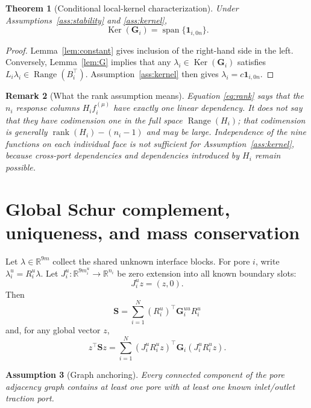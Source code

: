 \documentclass[11pt,a4paper]{article}
\newtheorem{assumption}{Assumption}[section]
\newtheorem{theorem}[assumption]{Theorem}
\newtheorem{remark}[assumption]{Remark}
\newcommand{\R}{\mathbb{R}}
\newcommand{\DtN}{\mathbf G}
\newcommand{\Schur}{\mathbf S}
\newcommand{\one}{\bm 1}
\newcommand{\Range}{\operatorname{Range}}
\newcommand{\Ker}{\operatorname{Ker}}
\newcommand{\rank}{\operatorname{rank}}
\begin{document}
\begin{theorem}[Conditional local-kernel characterization]
\label{thm:local-kernel}
Under Assumptions~\ref{ass:stability} and \ref{ass:kernel},
\begin{equation}\label{eq:exact-local-kernel}
 \Ker(\DtN_i)=\operatorname{span}\{\one_{i,0n}\}.
\end{equation}
\end{theorem}

\begin{proof}
Lemma~\ref{lem:constant} gives inclusion of the right-hand side in the left.
Conversely, Lemma~\ref{lem:G} implies that any
$\lambda_i\in\Ker(\DtN_i)$ satisfies
$L_i\lambda_i\in\Range(B_i^\top)$.  Assumption~\ref{ass:kernel} then gives
$\lambda_i=c\one_{i,0n}$.
\end{proof}

\begin{remark}[What the rank assumption means]
Equation \eqref{eq:rank} says that the $n_i$ response columns
$H_if_i^{(\mu)}$ have exactly one linear dependency.  It does \emph{not} say
that they have codimension one in the full space $\Range(H_i)$; that
codimension is generally
$\rank(H_i)-(n_i-1)$ and may be large.  Independence of the nine functions on
each individual face is not sufficient for Assumption~\ref{ass:kernel},
because cross-port dependencies and dependencies introduced by $H_i$ remain
possible.
\end{remark}

\section{Global Schur complement, uniqueness, and mass conservation}

Let $\lambda\in\R^{9m}$ collect the shared unknown interface blocks.  For
pore $i$, write $\lambda_i^u=R_i^u\lambda$.  Let
$J_i^u:\R^{9m_i^u}\to\R^{n_i}$ be zero extension into all known boundary
slots:
\[
 J_i^uz=(z,0).
\]
Then
\begin{equation}\label{eq:S}
 \Schur=\sum_{i=1}^N(R_i^u)^\top\DtN_i^{uu}R_i^u
\end{equation}
and, for any global vector $z$,
\begin{equation}\label{eq:Senergy}
 z^\top\Schur z
 =\sum_{i=1}^N(J_i^uR_i^uz)^\top\DtN_i(J_i^uR_i^uz).
\end{equation}

\begin{assumption}[Graph anchoring]\label{ass:anchor}
Every connected component of the pore adjacency graph contains at least one
pore with at least one known inlet/outlet traction port.
\end{assumption}
\end{document}
